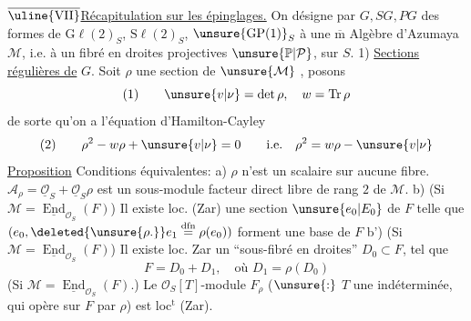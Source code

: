 $\overline{\text{\uline{VII}}}$\quad \uline{Récapitulation sur les épinglages.}
 On désigne par $G,SG,PG$ des formes de $\mathrm G\ell(2)_S$, $\mathrm S\ell(2)_S$, $\unsure{\mathrm{GP}(1)}_S$  à une $\overline{\mathrm m}$ Algèbre d'Azumaya $\mathcal M$, i.e. à un fibré en droites projectives $\unsure{\mathbb P|\mathcal P}$, sur $S$.
1) \uline{Sections régulières de} $G$.
Soit $\rho$ une section de $\unsure{\mathcal M}$ , posons
\[
(1)\qquad \unsure{v|\nu}=\det\rho,\quad w=\operatorname{Tr}\rho
\]
de sorte qu'on a l'équation d'Hamilton-Cayley
\[
(2)\qquad \rho^2-w\rho+\unsure{v|\nu}=0\qquad\text{i.e.}\quad\rho^2=w\rho-\unsure{v|\nu}
\]
\uline{Proposition} Conditions équivalentes:
a) $\rho$ n'est un scalaire sur aucune fibre.
 $\mathcal A_\rho=\underline{\mathcal O}_S+\underline{\mathcal O}_S\rho$ est un sous-module  facteur direct libre de rang $2$ de $\mathcal M$.
b) (Si $\mathcal M=\underline{\operatorname{End}}_{\mathcal O_S}(F)$) Il existe loc. (Zar) une section $\unsure{e_0|E_0}$ de $F$ telle que $(e_0,\deleted{\unsure{\rho.}}e_1\mathrel{\overset{\mathrm{dfn}}{=}}\rho(e_0))$ forment une base de $F$
b') (Si $\mathcal M=\underline{\operatorname{End}}_{\mathcal O_S}(F)$) Il existe loc. Zar un ``sous-fibré en droites'' $D_0\subset F$, tel que
\[
F=D_0+D_1,\quad\text{où }D_1=\rho(D_0)
\]
 (Si $\mathcal M=\underline{\operatorname{End}}_{\mathcal O_S}(F)$.) Le $\mathcal O_S[T]$-module $F_\rho$ ($\unsure{:}$ $T$  une indéterminée, qui opère sur $F$ par $\rho$) est   loc$^{\mathrm t}$ (Zar).
